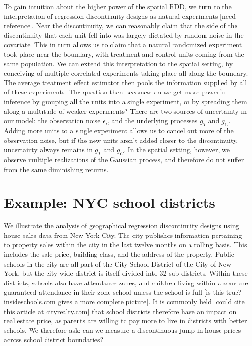 \documentclass[letter]{article}
\begin{document}
To gain intuition about the higher power of the spatial RDD, we turn to
the interpretation of regression discontinuity designs as natural
experiments {[}need reference{]}. Near the discontinuity, we can
reasonably claim that the side of the discontinuity that each unit fell
into was largely dictated by random noise in the covariate. This in turn
allows us to claim that a natural randomized experiment took place near
the boundary, with treatment and control units coming from the same
population. We can extend this interpretation to the spatial setting, by
conceiving of multiple correlated experiments taking place all along the
boundary. The average treatment effect estimator then pools the
information supplied by all of these experiments. The question then
becomes: do we get more powerful inference by grouping all the units
into a single experiment, or by spreading them along a multitude of
weaker experiments? There are two sources of uncertainty in our model:
the observation noise \(\epsilon_i\), and the underlying processes
\(g_T\) and \(g_C\). Adding more units to a single experiment allows us
to cancel out more of the observation noise, but if the new units aren't
added closer to the discontinuity, uncertainty always remains in \(g_T\)
and \(g_C\). In the spatial setting, however, we observe multiple
realizations of the Gaussian process, and therefore do not suffer from
the same diminishing returns.
    


    	\section{Example: NYC school
districts}\label{example-nyc-school-districts}

We illustrate the analysis of geographical regression discontinuity
designs using house sales data from New York City. The city publishes
information pertaining to property sales within the city in the last
twelve months on a rolling basis. This includes the sale price, building
class, and the address of the property. Public schools in the city are
all part of the City School District of the City of New York, but the
city-wide district is itself divided into 32 sub-districts. Within these
districts, schools also have attendance zones, and children living
within a zone are guaranteed attendance in their zone school unless the
school is full {[}is this true?
\href{http://insideschools.org/elementary/how-to-apply}{insideschools.com
gives a more complete picture}{]}. It is commonly held {[}could cite
\href{https://www.cityrealty.com/nyc/market-insight/features/trending-in-ny/buying-renting-school-zone-district-what-you-need-know/3661}{this
article at cityrealty.com}{]} that school districts therefore have an
impact on real estate price, as parents are willing to pay more to live
in districts with better schools. We therefore ask: can we measure a
discontinuous jump in house prices across school district boundaries?
    
\end{document}
